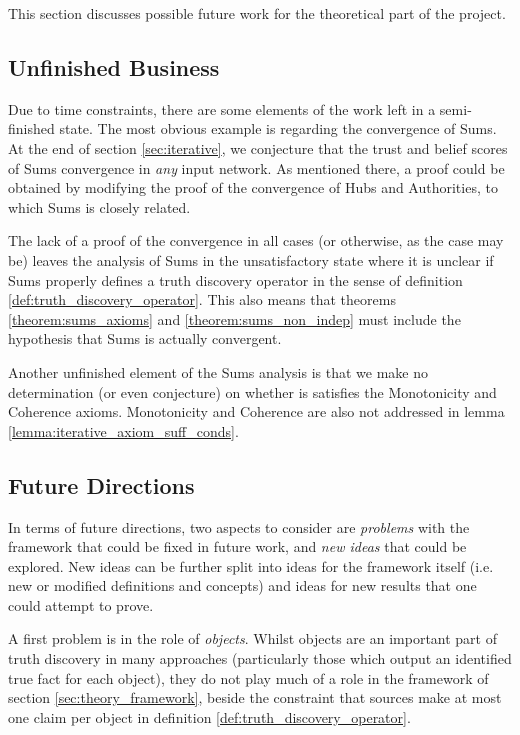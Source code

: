 \documentclass[../main.tex]{subfiles}
\begin{document}
This section discusses possible future work for the theoretical part of the
project.

\subsection{Unfinished Business}

Due to time constraints, there are some elements of the work left in a
semi-finished state. The most obvious example is regarding the convergence of
Sums. At the end of section \ref{sec:iterative}, we conjecture that the trust
and belief scores of Sums convergence in \emph{any} input network. As mentioned
there, a proof could be obtained by modifying the proof of the convergence of
Hubs and Authorities, to which Sums is closely related.

The lack of a proof of the convergence in all cases (or otherwise, as the case
may be) leaves the analysis of Sums in the unsatisfactory state where it is
unclear if Sums properly defines a truth discovery operator in the sense of
definition \ref{def:truth_discovery_operator}. This also means that theorems
\ref{theorem:sums_axioms} and \ref{theorem:sums_non_indep} must include the
hypothesis that Sums is actually convergent.

Another unfinished element of the Sums analysis is that we make no
determination (or even conjecture) on whether is satisfies the Monotonicity and
Coherence axioms. Monotonicity and Coherence are also not addressed in lemma
\ref{lemma:iterative_axiom_suff_conds}.

\subsection{Future Directions}

In terms of future directions, two aspects to consider are \emph{problems} with
the framework that could be fixed in future work, and \emph{new ideas} that
could be explored. New ideas can be further split into ideas for the framework
itself (i.e. new or modified definitions and concepts) and ideas for new
results that one could attempt to prove.

A first problem is in the role of \emph{objects}. Whilst objects are an
important part of truth discovery in many approaches (particularly those which
output an identified true fact for each object), they do not play much of a
role in the framework of section \ref{sec:theory_framework}, beside the
constraint that sources make at most one claim per object in definition
\ref{def:truth_discovery_operator}.
\end{document}
